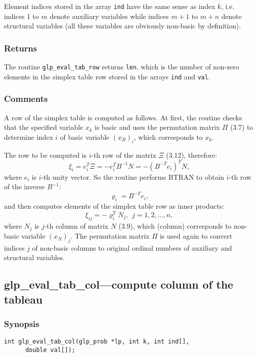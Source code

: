 Element indices stored in the array \verb|ind| have the same sense as
index $k$, i.e. indices 1 to $m$ denote auxiliary variables while
indices $m+1$ to $m+n$ denote structural variables (all these variables
are obviously non-basic by definition).

\subsubsection*{Returns}

The routine \verb|glp_eval_tab_row| returns \verb|len|, which is the
number of non-zero elements in the simplex table row stored in the
arrays \verb|ind| and \verb|val|.

\subsubsection*{Comments}

A row of the simplex table is computed as follows. At first, the
routine checks that the specified variable $x_k$ is basic and uses the
permutation matrix $\Pi$ (3.7) to determine index $i$ of basic variable
$(x_B)_i$, which corresponds to $x_k$.

The row to be computed is $i$-th row of the matrix $\Xi$ (3.12),
therefore:
$$\xi_i=e_i^T\Xi=-e_i^TB^{-1}N=-(B^{-T}e_i)^TN,$$
where $e_i$ is $i$-th unity vector. So the routine performs BTRAN to
obtain $i$-th row of the inverse $B^{-1}$:
$$\varrho_i=B^{-T}e_i,$$
and then computes elements of the simplex table row as inner products:
$$\xi_{ij}=-\varrho_i^TN_j,\ \ j=1,2,\dots,n,$$
where $N_j$ is $j$-th column of matrix $N$ (3.9), which (column)
corresponds to non-basic variable $(x_N)_j$. The permutation matrix
$\Pi$ is used again to convert indices $j$ of non-basic columns to
original ordinal numbers of auxiliary and structural variables.

\subsection{glp\_eval\_tab\_col---compute column of the tableau}

\subsubsection*{Synopsis}

\begin{verbatim}
int glp_eval_tab_col(glp_prob *lp, int k, int ind[],
      double val[]);
\end{verbatim}

